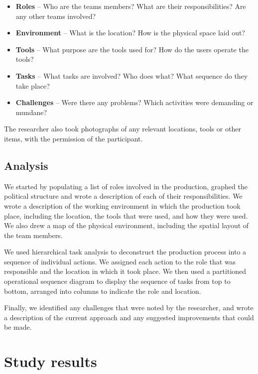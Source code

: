 {\singlespacing
\begin{itemize}
	\item \textbf{Roles} -- Who are the teams members? What are their responsibilities? Are any other teams involved?
	\item \textbf{Environment} -- What is the location? How is the physical space laid out?
	\item \textbf{Tools} -- What purpose are the tools used for? How do the users operate the tools?
	\item \textbf{Tasks} -- What tasks are involved? Who does what? What sequence do they take place?
	\item \textbf{Challenges} -- Were there any problems? Which activities were demanding or mundane?
\end{itemize}
}

The researcher also took photographs of any relevant locations, tools or other items, with the permission of the participant.

\subsection{Analysis}

We started by populating a list of roles involved in the production, graphed the political structure and wrote a description of each of their responsibilities. We wrote a description of the working environment in which the production took place, including the location, the tools that were used, and how they were used. We also drew a map of the physical environment, including the spatial layout of the team members.

We used hierarchical task analysis \citep{Kirwan1992,Annett2000} to deconstruct the production process into a sequence of individual actions. We assigned each action to the role that was responsible and the location in which it took place. We then used a partitioned operational sequence diagram \citep{Kirwan1992} to display the sequence of tasks from top to bottom, arranged into columns to indicate the role and location.

Finally, we identified any challenges that were noted by the researcher, and wrote a description of the current approach and any suggested improvements that could be made.

\section{Study results}\label{sec:ethno-results}

